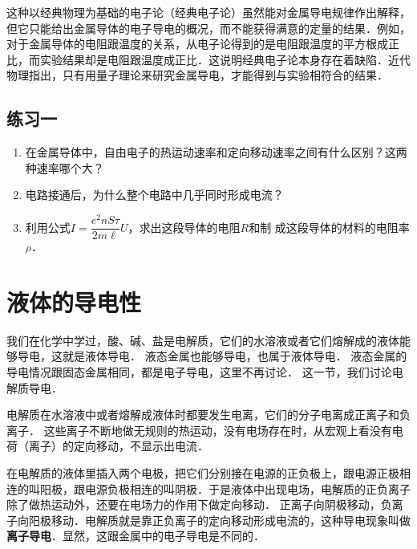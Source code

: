 这种以经典物理为基础的电子论（经典电子论）虽然能对金属导电规律作出解释，但它只能给出金属导体的电子导电的概况，而不能获得满意的定量的结果．例如，对于金属导体的电阻跟温度的关系，从电子论得到的是电阻跟温度的平方根成正比，而实验结果却是电阻跟温度成正比．这说明经典电子论本身存在着缺陷．近代物理指出，只有用量子理论来研究金属导电，才能得到与实验相符合的结果．

\subsection*{练习一}
\begin{enumerate}
    \item 在金属导体中，自由电子的热运动速率和定向移动速率之间有什么区别？这两种速率哪个大？
    \item 电路接通后，为什么整个电路中几乎同时形成电流？
    \item 利用公式$I=\dfrac{e^2 nS\tau}{2m\ell}U$，求出这段导体的电阻$R$和制
成这段导体的材料的电阻率$\rho$．
\end{enumerate}


\section{液体的导电性}
我们在化学中学过，酸、碱、盐是电解质，它们的水溶液或者它们熔解成的液体能够导电，这就是液体导电．
液态金属也能够导电，也属于液体导电．
液态金属的导电情况跟固态金属相同，都是电子导电，这里不再讨论．
这一节，我们讨论电解质导电．

电解质在水溶液中或者熔解成液体时都要发生电离，它们的分子电离成正离子和负离子．
这些离子不断地做无规则的热运动，没有电场存在时，从宏观上看没有电荷（离子）的定向移动，不显示出电流．

在电解质的液体里插入两个电极，把它们分别接在电源的正负极上，跟电源正极相连的叫阳极，跟电源负极相连的叫阴极．于是液体中出现电场，电解质的正负离子除了做热运动外，还要在电场力的作用下做定向移动．
正离子向阴极移动，负离子向阳极移动．电解质就是靠正负离子的定向移动形成电流的，这种导电现象叫做\textbf{离子导电}．显然，这跟金属中的电子导电是不同的．

